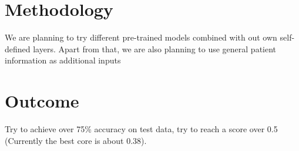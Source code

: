 \documentclass[10pt,twocolumn,letterpaper]{article}
\begin{document}
\section{Methodology}
We are planning to try different pre-trained models combined with out own self-defined layers. Apart from that, we are also planning to use general patient information as additional inputs 

\section{Outcome}
    Try to achieve over 75\% accuracy on test data, try to reach a score over 0.5 (Currently the best core is about 0.38).

{\small


}
\end{document}
